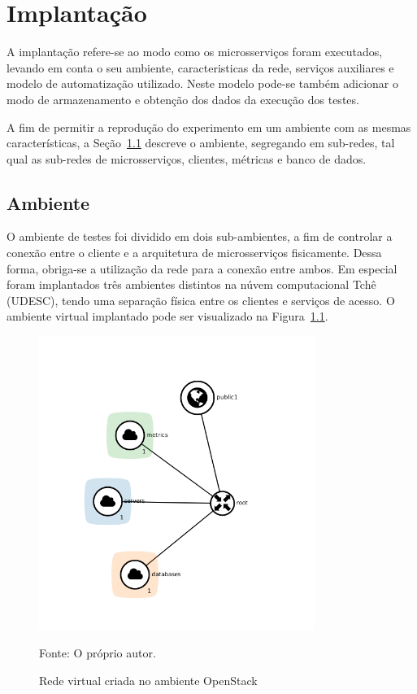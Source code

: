 \chapter{Implantação}
\label{cap6}

A implantação refere-se ao modo como os microsserviços foram executados, levando em conta o seu ambiente, caracteristicas da rede, serviços auxiliares e modelo de automatização utilizado.
%
Neste modelo pode-se também adicionar o modo de armazenamento e obtenção dos dados da execução dos testes.

A fim de permitir a reprodução do experimento em um ambiente com as mesmas características, a Seção~\ref{sec:ambiente} descreve o ambiente, segregando em sub-redes, tal qual as sub-redes de microsserviços, clientes, métricas e banco de dados.


\section{Ambiente}
\label{sec:ambiente}

O ambiente de testes foi dividido em dois sub-ambientes, a fim de controlar a conexão entre o cliente e a arquitetura de microsserviços fisicamente.
%
Dessa forma, obriga-se a utilização da rede para a conexão entre ambos.
%
Em especial foram implantados três ambientes distintos na núvem computacional Tchê (UDESC), tendo uma separação física entre os clientes e serviços de acesso.
%
O ambiente virtual implantado pode ser visualizado na Figura~\ref{fig:network_open_stack}.

\begin{figure}[htb!]
  \caption{Rede virtual criada no ambiente OpenStack}
  \label{fig:network_open_stack}
  \includegraphics[width=0.8\textwidth]{figuras/network/circles_only_networks.png}
  \centering

  Fonte: O próprio autor.
\end{figure}

